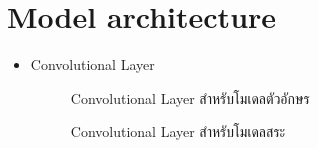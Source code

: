 \documentclass[12pt,oneside,openright,a4paper]{cpe-thai-project}
\begin{document}
  \section{Model architecture}
  \begin{itemize}
    \item Convolutional Layer
    \begin{figure}[!ht]\centering
      \setlength{\fboxrule}{0.2mm} %
      \setlength{\fboxsep}{1cm}
      \caption{Convolutional Layer สำหรับโมเดลตัวอักษร}\label{fig:convolutionallayer}
     \end{figure}
     \begin{figure}[!ht]\centering
      \setlength{\fboxrule}{0.2mm} %
      \setlength{\fboxsep}{1cm}
      \caption{Convolutional Layer สำหรับโมเดลสระ}\label{fig:convolutionallayer}
     \end{figure}
  

\end{itemize}
\end{document}
